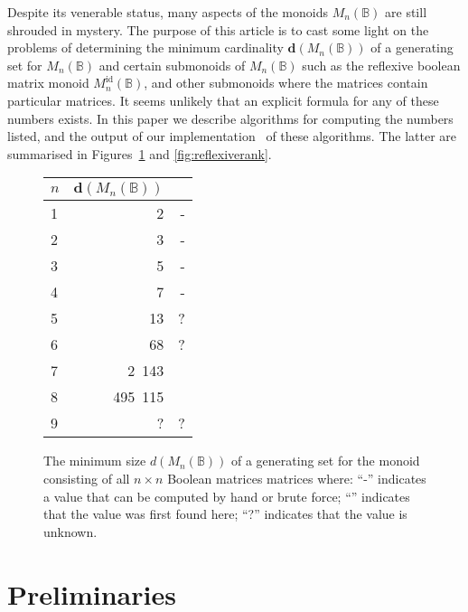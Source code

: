 \documentclass[11pt]{article}
\numberwithin{equation}{section}
\newcommand{\B}{\mathbb{B}}
\newcommand{\Bn}{M_n(\B)}
\newcommand{\Refn}{M_n^{\text{id}}(\B)}
\newcommand{\cmark}{\ding{51}}
\begin{document}
Despite its venerable status, many aspects of the monoids $\Bn$ are still
shrouded in mystery. The purpose of this article is to cast some light on the
problems of determining the minimum cardinality $\mathbf{d}(\Bn)$ of a
generating set for $\Bn$ and certain submonoids of $\Bn$ such as the reflexive
boolean matrix monoid $\Refn$, and other submonoids where the matrices contain
particular matrices.
It seems unlikely that an explicit formula for any of these numbers exists.
In this paper we describe algorithms for computing the numbers listed,
and the output of our implementation~\cite{} of these algorithms. The latter
are summarised in Figures~\ref{figure-table-1} and \ref{fig:reflexiverank}.

\begin{figure}
  \centering
  \begin{tabular}{l|r|r}
    $n$ & $\mathbf{d}(\Bn)$ &   \\
    \hline
    1 & 2          & - \\ 
    2 & 3          & - \\ 
    3 & 5          & - \\ 
    4 & 7          & - \\
    5 & 13         & ? \\
    6 & 68         & ? \\ 
    7 & 2\ 143     & \cmark \\
    8 & 495\ 115   & \cmark \\
    9 & ?          & ?
  \end{tabular}
\vspace{1cm}

  \caption{The minimum size $d(\Bn)$ of a generating set for the monoid
  consisting of all $n \times n$ Boolean matrices matrices where: 
  ``-'' indicates a value that can be computed by hand or brute force;
  ``\cmark'' indicates that the value was first found here;
  ``?'' indicates that the value is unknown.}
  \label{figure-table-1}
\end{figure}

\section{Preliminaries}
\label{section-preliminaries}
\end{document}
